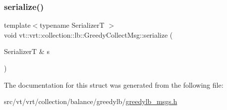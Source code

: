 \mbox{\label{structvt_1_1vrt_1_1collection_1_1lb_1_1_greedy_collect_msg_ac0f5ca855ef36a56595e6ab019cf9487}} 
\subsubsection{\texorpdfstring{serialize()}{serialize()}}
{\footnotesize\ttfamily template$<$typename SerializerT $>$ \\
void vt\+::vrt\+::collection\+::lb\+::\+Greedy\+Collect\+Msg\+::serialize (\begin{DoxyParamCaption}\item[{SerializerT \&}]{s }\end{DoxyParamCaption})\hspace{0.3cm}{\ttfamily [inline]}}



The documentation for this struct was generated from the following file\+:\begin{DoxyCompactItemize}
\item 
src/vt/vrt/collection/balance/greedylb/\hyperlink{greedylb__msgs_8h}{greedylb\+\_\+msgs.\+h}\end{DoxyCompactItemize}
